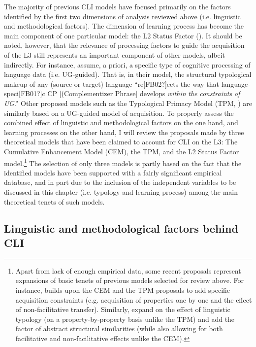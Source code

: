 \documentclass[output=paper,modfonts,nonflat,newtxmath]{langsci/langscibook}
\begin{document}
The majority of previous CLI models have focused primarily on the factors identified by the first two dimensions of analysis reviewed above (i.e. linguistic and methodological factors). The dimension of learning process has become the main component of one particular model: the L2 Status Factor (\citealt{BardelFalk2007, BardelFalk2012, FalkBardel2010, FalkBardel2011}). It should be noted, however, that the relevance of processing factors to guide the acquisition of the L3 still represents an important component of other models, albeit indirectly. For instance, \citet[9]{BerkesFlynn2012} assume, a priori, a specific type of cognitive processing of language data (i.e. UG-guided). That is, in their model, the structural typological makeup of any (source or target) language “re[FB02?]ects the way that language-speci[FB01?]c CP [(Complementizer Phrase] develops \textit{within} \textit{the} \textit{constraints} \textit{of} \textit{UG}.” Other proposed models such as the Typological Primacy Model (TPM, \citealt{Rothman2011, Rothman2015}) are similarly based on a UG-guided model of acquisition. To properly assess the combined effect of linguistic and methodological factors on the one hand, and learning processes on the other hand, I will review the proposals made by three theoretical models that have been claimed to account for CLI on the L3: The Cumulative Enhancement Model (CEM), the TPM, and the L2 Status Factor model.\footnote{Apart from lack of enough empirical data, some recent proposals represent expansions of basic tenets of previous models selected for review above. For instance, \citet{Slabakova2017} builds upon the CEM and the TPM proposals to add specific acquisition constraints (e.g. acquisition of properties one by one and the effect of non-facilitative transfer). Similarly, \citet{WestergaardEtAl2017} expand on the effect of linguistic typology (on a property-by-property basis unlike the TPM) and add the factor of abstract structural similarities (while also allowing for both facilitative and non-facilitative effects unlike the CEM).} The selection of only three models is partly based on the fact that the identified models have been supported with a fairly significant empirical database, and in part due to the inclusion of the independent variables to be discussed in this chapter (i.e. typology and learning process) among the main theoretical tenets of such models.

\subsection{{Linguistic} {and} {methodological} {factors} {behind} {CLI}} %
\label{sec:salaberry:2.1}
\end{document}

